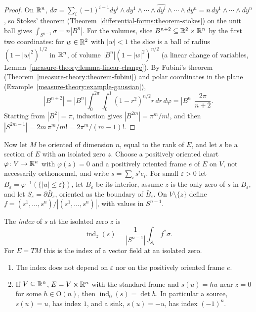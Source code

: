 \begin{proof}
On $\mathbb{R}^n$, $d\sigma = \sum_i(-1)^{i-1}dy^i \wedge dy^1 \wedge \cdots \wedge \widehat{dy^i} \wedge \cdots \wedge dy^n = n\,dy^1 \wedge \cdots \wedge dy^n$, so Stokes' theorem
(Theorem~\ref{differential-forms:theorem-stokes}) on the unit ball gives $\int_{S^{n-1}}\sigma = n|B^n|$. For the volumes, slice $B^{n+2} \subseteq \mathbb{R}^2 \times \mathbb{R}^n$ by the first two
coordinates: for $w \in \mathbb{R}^2$ with $|w| < 1$ the slice is a ball of radius $(1 - |w|^2)^{1/2}$ in $\mathbb{R}^n$, of volume $|B^n|(1 - |w|^2)^{n/2}$ (a linear change of variables,
Lemma~\ref{measure-theory:lemma-linear-change}). By Fubini's theorem (Theorem~\ref{measure-theory:theorem-fubini}) and polar coordinates in the plane
(Example~\ref{measure-theory:example-gaussian}),
\[
|B^{n+2}| = |B^n|\int_0^{2\pi}\!\!\int_0^1(1 - r^2)^{n/2}r\,dr\,d\varphi = |B^n|\,\frac{2\pi}{n + 2} .
\]
Starting from $|B^2| = \pi$, induction gives $|B^{2m}| = \pi^m/m!$, and then $|S^{2m-1}| = 2m\,\pi^m/m! = 2\pi^m/(m-1)!$.
\end{proof}

Now let $M$ be oriented of dimension $n$, equal to the rank of $E$, and let $s$ be a section of $E$ with an isolated zero $z$. Choose a positively oriented chart $\varphi \colon V \to \mathbb{R}^n$ with
$\varphi(z) = 0$ and a positively oriented frame $e$ of $E$ on $V$, not necessarily orthonormal, and write $s = \sum_is^ie_i$. For small $\varepsilon > 0$ let
$\bar B_\varepsilon = \varphi^{-1}(\{|u| \leq \varepsilon\})$, let $B_\varepsilon$ be its interior, assume $z$ is the only zero of $s$ in $\bar B_\varepsilon$, and let $S_\varepsilon = \partial\bar B_\varepsilon$, oriented as the boundary of
$\bar B_\varepsilon$. On $V \setminus \{z\}$ define $f = (s^1, \ldots, s^n)/|(s^1, \ldots, s^n)|$, with values in $S^{n-1}$.

\begin{definition}\label{characteristic-classes:definition-index}
The \emph{index} of $s$ at the isolated zero $z$ is
\[
\operatorname{ind}_z(s) = \frac{1}{|S^{n-1}|}\int_{S_\varepsilon}f^*\sigma .
\]
For $E = TM$ this is the index of a vector field at an isolated zero.
\end{definition}

\begin{lemma}\label{characteristic-classes:lemma-index}
\begin{enumerate}
\item The index does not depend on $\varepsilon$ nor on the positively oriented frame $e$.
\item If $V \subseteq \mathbb{R}^n$, $E = V \times \mathbb{R}^n$ with the standard frame and $s(u) = hu$ near $z = 0$ for some $h \in \mathrm{O}(n)$, then $\operatorname{ind}_0(s) = \det h$. In particular a
source, $s(u) = u$, has index $1$, and a sink, $s(u) = -u$, has index $(-1)^n$.
\end{enumerate}
\end{lemma}


